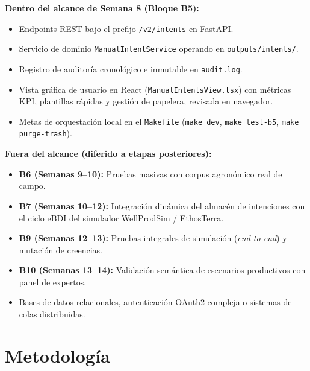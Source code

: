 \documentclass[11pt,a4paper]{article}
\begin{document}
\textbf{Dentro del alcance de Semana 8 (Bloque B5):}
\begin{itemize}[itemsep=2pt]
    \item Endpoints REST bajo el prefijo \texttt{/v2/intents} en FastAPI.
    \item Servicio de dominio \texttt{ManualIntentService} operando en \texttt{outputs/intents/}.
    \item Registro de auditoría cronológico e inmutable en \texttt{audit.log}.
    \item Vista gráfica de usuario en React (\texttt{ManualIntentsView.tsx}) con métricas KPI, plantillas rápidas y gestión de papelera, revisada en navegador.
    \item Metas de orquestación local en el \texttt{Makefile} (\texttt{make dev}, \texttt{make test-b5}, \texttt{make purge-trash}).
\end{itemize}

\textbf{Fuera del alcance (diferido a etapas posteriores):}
\begin{itemize}[itemsep=2pt]
    \item \textbf{B6 (Semanas 9--10):} Pruebas masivas con corpus agronómico real de campo.
    \item \textbf{B7 (Semanas 10--12):} Integración dinámica del almacén de intenciones con el ciclo eBDI del simulador WellProdSim / EthosTerra.
    \item \textbf{B9 (Semanas 12--13):} Pruebas integrales de simulación (\textit{end-to-end}) y mutación de creencias.
    \item \textbf{B10 (Semanas 13--14):} Validación semántica de escenarios productivos con panel de expertos.
    \item Bases de datos relacionales, autenticación OAuth2 compleja o sistemas de colas distribuidas.
\end{itemize}

\section{Metodología}
\end{document}
